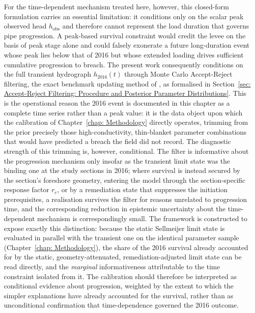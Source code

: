 For the time-dependent mechanism treated here, however, this closed-form formulation carries an essential limitation: it conditions only on the scalar peak observed head $h_{\mathrm{obs}}$ and therefore cannot represent the load duration that governs pipe progression. A peak-based survival constraint would credit the levee on the basis of peak stage alone and could falsely exonerate a future long-duration event whose peak lies below that of 2016 but whose extended loading drives sufficient cumulative progression to breach. The present work consequently conditions on the full transient hydrograph $h_{2016}(t)$ through Monte Carlo Accept-Reject filtering, the exact benchmark updating method of \textcite{schweckendiek_2014}, as formalised in Section~\ref{sec: Accept-Reject Filtering: Procedure and Posterior Parameter Distributions}. This is the operational reason the 2016 event is documented in this chapter as a complete time series rather than a peak value: it is the data object upon which the calibration of Chapter~\ref{chap: Methodology} directly operates, trimming from the prior precisely those high-conductivity, thin-blanket parameter combinations that would have predicted a breach the field did not record. The diagnostic strength of this trimming is, however, conditional. The filter is informative about the progression mechanism only insofar as the transient limit state was the binding one at the study sections in 2016; where survival is instead secured by the section's foreshore geometry, entering the model through the section-specific response factor $r_e$, or by a remediation state that suppresses the initiation prerequisites, a realisation survives the filter for reasons unrelated to progression time, and the corresponding reduction in epistemic uncertainty about the time-dependent mechanism is correspondingly small. The framework is constructed to expose exactly this distinction: because the static Sellmeijer limit state is evaluated in parallel with the transient one on the identical parameter sample (Chapter~\ref{chap: Methodology}), the share of the 2016 survival already accounted for by the static, geometry-attenuated, remediation-adjusted limit state can be read directly, and the \emph{marginal} informativeness attributable to the time constraint isolated from it. The calibration should therefore be interpreted as conditional evidence about progression, weighted by the extent to which the simpler explanations have already accounted for the survival, rather than as unconditional confirmation that time-dependence governed the 2016 outcome.

